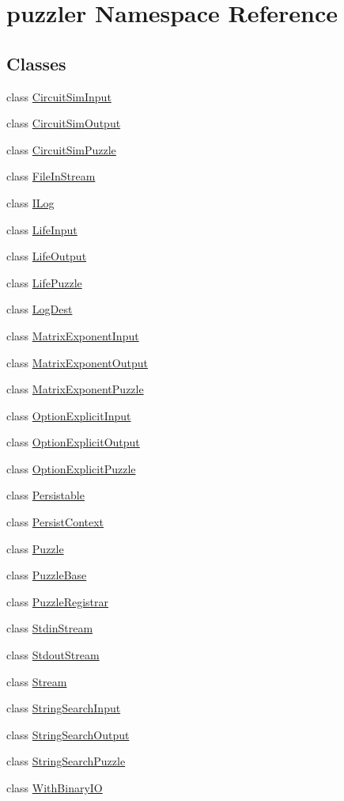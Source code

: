 \hypertarget{a00145}{}\section{puzzler Namespace Reference}
\label{a00145}
\subsection*{Classes}
\begin{DoxyCompactItemize}
\item 
class \hyperlink{a00003}{Circuit\+Sim\+Input}
\item 
class \hyperlink{a00004}{Circuit\+Sim\+Output}
\item 
class \hyperlink{a00006}{Circuit\+Sim\+Puzzle}
\item 
class \hyperlink{a00007}{File\+In\+Stream}
\item 
class \hyperlink{a00008}{I\+Log}
\item 
class \hyperlink{a00010}{Life\+Input}
\item 
class \hyperlink{a00011}{Life\+Output}
\item 
class \hyperlink{a00013}{Life\+Puzzle}
\item 
class \hyperlink{a00014}{Log\+Dest}
\item 
class \hyperlink{a00015}{Matrix\+Exponent\+Input}
\item 
class \hyperlink{a00016}{Matrix\+Exponent\+Output}
\item 
class \hyperlink{a00018}{Matrix\+Exponent\+Puzzle}
\item 
class \hyperlink{a00019}{Option\+Explicit\+Input}
\item 
class \hyperlink{a00020}{Option\+Explicit\+Output}
\item 
class \hyperlink{a00022}{Option\+Explicit\+Puzzle}
\item 
class \hyperlink{a00024}{Persistable}
\item 
class \hyperlink{a00025}{Persist\+Context}
\item 
class \hyperlink{a00026}{Puzzle}
\item 
class \hyperlink{a00027}{Puzzle\+Base}
\item 
class \hyperlink{a00028}{Puzzle\+Registrar}
\item 
class \hyperlink{a00029}{Stdin\+Stream}
\item 
class \hyperlink{a00030}{Stdout\+Stream}
\item 
class \hyperlink{a00031}{Stream}
\item 
class \hyperlink{a00032}{String\+Search\+Input}
\item 
class \hyperlink{a00033}{String\+Search\+Output}
\item 
class \hyperlink{a00035}{String\+Search\+Puzzle}
\item 
class \hyperlink{a00036}{With\+Binary\+I\+O}
\end{DoxyCompactItemize}

